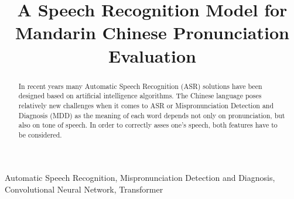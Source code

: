 \documentclass[conference]{IEEEtran}
\begin{document}
\title{A Speech Recognition Model for Mandarin Chinese Pronunciation Evaluation}

\author{
\and
{}
\and
{}
\and
{}
\and
{}
}

\maketitle

\begin{abstract}
In recent years many Automatic Speech Recognition (ASR) solutions have been designed based on artificial intelligence algorithms. The Chinese language poses relatively new challenges when it comes to ASR or Mispronunciation Detection and Diagnosis (MDD) as the meaning of each word depends not only on pronunciation, but also on tone of speech. In order to correctly asses one's speech, both features have to be considered.
\end{abstract}

\begin{IEEEkeywords}
Automatic Speech Recognition, Mispronunciation Detection and Diagnosis, Convolutional Neural Network, Transformer
\end{IEEEkeywords}
\end{document}
